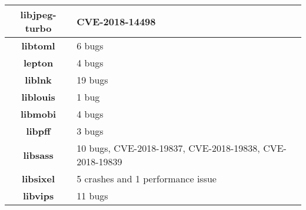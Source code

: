 \begin{table}[h]
\begin{tabular}{|c|l|}
\textbf{libjpeg-turbo}  & CVE-2018-14498                                                                                                                                                                                     \\ \hline
\textbf{libtoml}        & 6 bugs                                                                                                                                                                                             \\ \hline
\textbf{lepton}         & 4 bugs                                                                                                                                                                                             \\ \hline
\textbf{liblnk}         & 19 bugs                                                                                                                                                                                            \\ \hline
\textbf{liblouis}       & 1 bug                                                                                                                                                                                              \\ \hline
\textbf{libmobi}        & 4 bugs                                                                                                                                                                                             \\ \hline
\textbf{libpff}         & 3 bugs                                                                                                                                                                                             \\ \hline
\textbf{libsass}        & 10 bugs, CVE-2018-19837, CVE-2018-19838, CVE-2018-19839                                                                                                                                            \\ \hline
\textbf{libsixel}       & 5 crashes and 1 performance issue                                                                                                                                                                  \\ \hline
\textbf{libvips}        & 11 bugs                                                                                                                                                                                            \\ \hline

\end{tabular}
\end{table}
